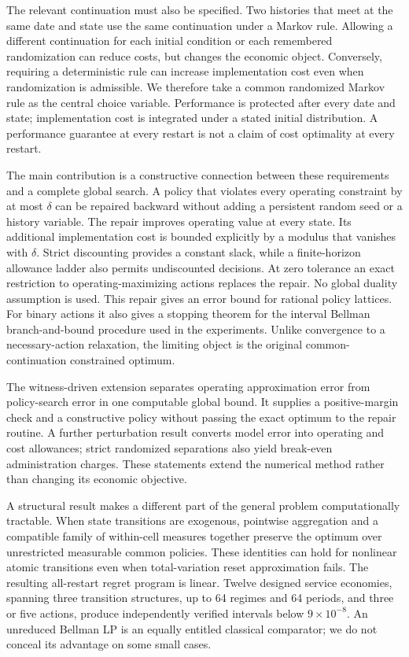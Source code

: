 The relevant continuation must also be specified. Two histories that meet at the same date and state use the same continuation under a Markov rule. Allowing a different continuation for each initial condition or each remembered randomization can reduce costs, but changes the economic object. Conversely, requiring a deterministic rule can increase implementation cost even when randomization is admissible. We therefore take a common randomized Markov rule as the central choice variable. Performance is protected after every date and state; implementation cost is integrated under a stated initial distribution. A performance guarantee at every restart is not a claim of cost optimality at every restart.

The main contribution is a constructive connection between these requirements and a complete global search. A policy that violates every operating constraint by at most $\delta$ can be repaired backward without adding a persistent random seed or a history variable. The repair improves operating value at every state. Its additional implementation cost is bounded explicitly by a modulus that vanishes with $\delta$. Strict discounting provides a constant slack, while a finite-horizon allowance ladder also permits undiscounted decisions. At zero tolerance an exact restriction to operating-maximizing actions replaces the repair. No global duality assumption is used. This repair gives an error bound for rational policy lattices. For binary actions it also gives a stopping theorem for the interval Bellman branch-and-bound procedure used in the experiments. Unlike convergence to a necessary-action relaxation, the limiting object is the original common-continuation constrained optimum.

The witness-driven extension separates operating approximation error from policy-search error in one computable global bound. It supplies a positive-margin check and a constructive policy without passing the exact optimum to the repair routine. A further perturbation result converts model error into operating and cost allowances; strict randomized separations also yield break-even administration charges. These statements extend the numerical method rather than changing its economic objective.

A structural result makes a different part of the general problem computationally tractable. When state transitions are exogenous, pointwise aggregation and a compatible family of within-cell measures together preserve the optimum over unrestricted measurable common policies. These identities can hold for nonlinear atomic transitions even when total-variation reset approximation fails. The resulting all-restart regret program is linear. Twelve designed service economies, spanning three transition structures, up to 64 regimes and 64 periods, and three or five actions, produce independently verified intervals below $9\times10^{-8}$. An unreduced Bellman LP is an equally entitled classical comparator; we do not conceal its advantage on some small cases.

